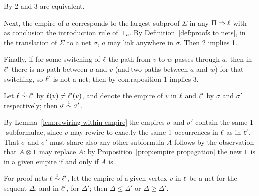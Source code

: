 \documentclass[conference]{IEEEtran}
\begin{document}
\begin{IEEEproof}
By \cite[Proposition 2.a]{Bellin-vandeWiele-1995} 2 and 3 are equivalent.

Next, the empire of $a$ corresponds to the largest subproof $\Sigma$ in any $\Pi\Mapsto\ell$ with as conclusion the introduction rule of $\bot_{a}$.
%
By Definition~\ref{def:proofs to nets}, in the translation of $\Sigma$ to a net $\sigma$, $a$ may link anywhere in $\sigma$.
%
Then 2 implies 1. 

Finally, if for some switching of $\ell$ the path from $v$ to $w$ passes through $a$, then in $\ell'$ there is no path between $a$ and $v$ (and two paths between $a$ and $w$) for that switching, so $\ell'$ is not a net; then by contraposition 1 implies 3.
%
\end{IEEEproof}


\begin{lemma}
\label{lem:rewiring preserves empire}
Let $\links\perm*\links'$ by $\ell(v)\neq\ell'(v)$, and denote the empire of $v$ in $\ell$ and $\ell'$ by $\sigma$ and $\sigma'$ respectively; then $\sigma\perm*\sigma'$.
\end{lemma}

\begin{IEEEproof}
By Lemma~\ref{lem:rewiring within empire} the empires $\sigma$ and $\sigma'$ contain the same $1$-subformulae, since $v$ may rewire to exactly the same $1$-occurrences in $\ell$ as in $\ell'$.
%
That $\sigma$ and $\sigma'$ must share also any other subformula $A$ follows by the observation that $A\otimes1$ may replace $A$: by Proposition~\ref{prop:empire propagation} the new $1$ is in a given empire if and only if $A$ is.
%
\end{IEEEproof}


\begin{lemma}
\label{lem:rewiring affects empires}
For proof nets $\links\perm*\links'$, let the empire of a given vertex $v$ in $\ell$ be a net for the sequent $\Delta$, and in $\ell'$, for $\Delta'$; then $\Delta\leq\Delta'$ or $\Delta\geq\Delta'$.
\end{lemma}
\end{document}
